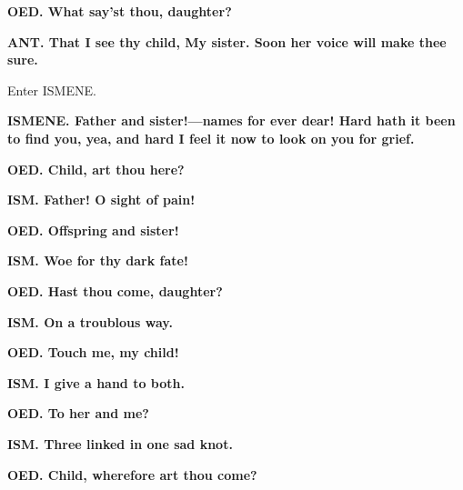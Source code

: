 \documentclass[11pt,letter]{book}
\begin{document}
\par \textbf{OED. What say’st thou, daughter?}
\par 

\par \textbf{ANT. That I see thy child, My sister. Soon her voice will make thee sure.}
\par 

\par  Enter ISMENE.

\par \textbf{ISMENE. Father and sister!—names for ever dear! Hard hath it been to find you, yea, and hard I feel it now to look on you for grief.}
\par 

\par \textbf{OED. Child, art thou here?}
\par 

\par \textbf{ISM. Father! O sight of pain!}
\par 

\par \textbf{OED. Offspring and sister!}
\par 

\par \textbf{ISM. Woe for thy dark fate!}
\par 

\par \textbf{OED. Hast thou come, daughter?}
\par 

\par \textbf{ISM. On a troublous way.}
\par 

\par \textbf{OED. Touch me, my child!}
\par 

\par \textbf{ISM. I give a hand to both.}
\par 

\par \textbf{OED. To her and me?}
\par 

\par \textbf{ISM. Three linked in one sad knot.}
\par 

\par \textbf{OED. Child, wherefore art thou come?}
\par 
\end{document}
